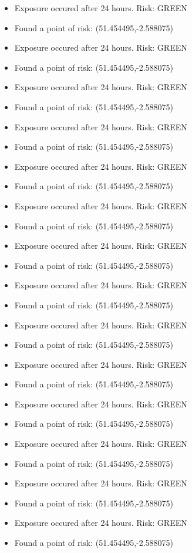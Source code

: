 \documentclass{article}
\begin{document}
\begin{itemize}
\begin{itemize}
			\item	{Exposure occured after 24 hours. Risk: GREEN}
			\item	{Found a point of risk: (51.454495,-2.588075)}
			\item	{Exposure occured after 24 hours. Risk: GREEN}
			\item	{Found a point of risk: (51.454495,-2.588075)}
			\item	{Exposure occured after 24 hours. Risk: GREEN}
			\item	{Found a point of risk: (51.454495,-2.588075)}
			\item	{Exposure occured after 24 hours. Risk: GREEN}
			\item	{Found a point of risk: (51.454495,-2.588075)}
			\item	{Exposure occured after 24 hours. Risk: GREEN}
			\item	{Found a point of risk: (51.454495,-2.588075)}
			\item	{Exposure occured after 24 hours. Risk: GREEN}
			\item	{Found a point of risk: (51.454495,-2.588075)}
			\item	{Exposure occured after 24 hours. Risk: GREEN}
			\item	{Found a point of risk: (51.454495,-2.588075)}
			\item	{Exposure occured after 24 hours. Risk: GREEN}
			\item	{Found a point of risk: (51.454495,-2.588075)}
			\item	{Exposure occured after 24 hours. Risk: GREEN}
			\item	{Found a point of risk: (51.454495,-2.588075)}
			\item	{Exposure occured after 24 hours. Risk: GREEN}
			\item	{Found a point of risk: (51.454495,-2.588075)}
			\item	{Exposure occured after 24 hours. Risk: GREEN}
			\item	{Found a point of risk: (51.454495,-2.588075)}
			\item	{Exposure occured after 24 hours. Risk: GREEN}
			\item	{Found a point of risk: (51.454495,-2.588075)}
			\item	{Exposure occured after 24 hours. Risk: GREEN}
			\item	{Found a point of risk: (51.454495,-2.588075)}
			\item	{Exposure occured after 24 hours. Risk: GREEN}
			\item	{Found a point of risk: (51.454495,-2.588075)}

\end{itemize}
\end{itemize}
\end{document}
